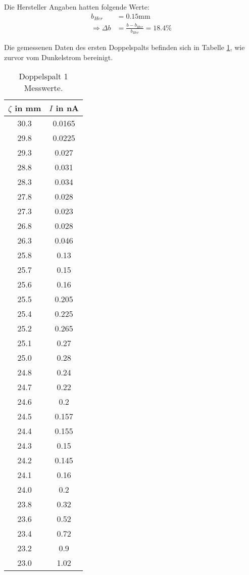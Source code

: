 Die Hersteller Angaben hatten folgende Werte:
\begin{align*}
  b_{Her} &= 0.15 \text{mm} \\
  \Rightarrow \Delta b &= \frac{b - b_{Her}}{b_{Her}} = 18.4 \%
\end{align*}

Die gemessenen Daten des ersten Doppelspalts befinden sich in Tabelle \ref{tab:doppel1}, wie zurvor vom Dunkelstrom bereinigt.

\begin{table}
  \centering
  \caption{Doppelspalt 1 Messwerte.}
  \label{tab:doppel1}
\begin{tabular}{c c}
  \toprule
  $\zeta$ in mm & $I$ in nA \\
  \midrule
  30.3  &  0.0165 \\
  29.8  &  0.0225 \\
  29.3  &  0.027 \\
  28.8  &  0.031 \\
  28.3  &  0.034 \\
  27.8  &  0.028 \\
  27.3  &  0.023 \\
  26.8  &  0.028 \\
  26.3  &  0.046 \\
  25.8  &  0.13 \\
  25.7  &  0.15 \\
  25.6  &  0.16 \\
  25.5  &  0.205 \\
  25.4  &  0.225 \\
  25.2  &  0.265 \\
  25.1  &  0.27 \\
  25.0  &  0.28 \\
  24.8  &  0.24 \\
  24.7  &  0.22 \\
  24.6  &  0.2 \\
  24.5  &  0.157 \\
  24.4  &  0.155 \\
  24.3  &  0.15 \\
  24.2  &  0.145 \\
  24.1  &  0.16 \\
  24.0  &  0.2 \\
  23.8  &  0.32 \\
  23.6  &  0.52 \\
  23.4  &  0.72 \\
  23.2  &  0.9 \\
  23.0  &  1.02 \\

\end{tabular}
\end{table}
